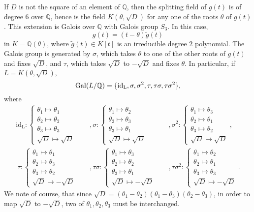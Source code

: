 If $D$ is not the square of an element of $\mathbb{Q}$, then the splitting field of $g(t)$ is of degree $6$ over $\mathbb{Q}$, hence is the field $K\left(\theta, \sqrt{D}\right)$ for any one of the roots $\theta$ of $g(t)$. This extension is Galois over $\mathbb{Q}$ with Galois group $S_3$. In this case, 
\[g(t) = (t - \theta)\tilde{g}(t)\]
in $K = \mathbb{Q}(\theta)$, where $\tilde{g}(t) \in K[t]$ is an irreducible degree $2$ polynomial. The Galois group is generated by $\sigma$, which takes $\theta$ to one of the other roots of $g(t)$ and fixes $\sqrt{D}$, and $\tau$, which takes $\sqrt{D}$ to $-\sqrt{D}$ and fixes $\theta$. In particular, if $L = K(\theta, \sqrt{D})$,
\[\operatorname{Gal}(L/\mathbb{Q}) = \{ \text{id}_\text{L}, \sigma, \sigma^2, \tau, \tau\sigma, \tau\sigma^2\},\]
where
\begin{align*}
\text{id}_{\text{L}}: 
\begin{cases}
\theta_1 \mapsto \theta_1\\
\theta_2 \mapsto \theta_2\\
\theta_3 \mapsto \theta_3\\
\sqrt{D} \mapsto \sqrt{D}
\end{cases}
& \quad ,
\sigma: 
\begin{cases}
\theta_1 \mapsto \theta_2\\
\theta_2 \mapsto \theta_3\\
\theta_3 \mapsto \theta_1\\
\sqrt{D} \mapsto \sqrt{D}
\end{cases}
& \quad ,
\sigma^2: 
\begin{cases}
\theta_1 \mapsto \theta_3\\
\theta_2 \mapsto \theta_1\\
\theta_3 \mapsto \theta_2\\
\sqrt{D} \mapsto \sqrt{D}
\end{cases}, \\ \
\tau: 
\begin{cases}
\theta_1 \mapsto \theta_1\\
\theta_2 \mapsto \theta_3\\
\theta_3 \mapsto \theta_2\\
\sqrt{D} \mapsto -\sqrt{D}
\end{cases}
& \quad ,
\tau\sigma: 
\begin{cases}
\theta_1 \mapsto \theta_3\\
\theta_2 \mapsto \theta_2\\
\theta_3 \mapsto \theta_1\\
\sqrt{D} \mapsto -\sqrt{D}
\end{cases}
& \quad ,
\tau\sigma^2: 
\begin{cases}
\theta_1 \mapsto \theta_2\\
\theta_2 \mapsto \theta_1\\
\theta_3 \mapsto \theta_3\\
\sqrt{D} \mapsto -\sqrt{D}
\end{cases}.
\end{align*}
We note of course, that since $\sqrt{D} = (\theta_1-\theta_2)(\theta_1-\theta_3)(\theta_2-\theta_3)$, in order to map $\sqrt{D}$ to $-\sqrt{D}$, two of $\theta_1,\theta_2,\theta_3$ must be interchanged. 

